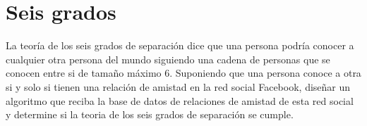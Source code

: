 \section{Seis grados}
La teoría de los seis grados de separación dice que una persona podría conocer a cualquier otra persona del mundo siguiendo una cadena de personas que se conocen entre si de tamaño máximo 6. Suponiendo que una persona conoce a otra si y solo si tienen una relación de amistad en la red social Facebook, diseñar un algoritmo que reciba la base de datos de relaciones de amistad de esta red social y determine si la teoria de los seis grados de separación se cumple.
